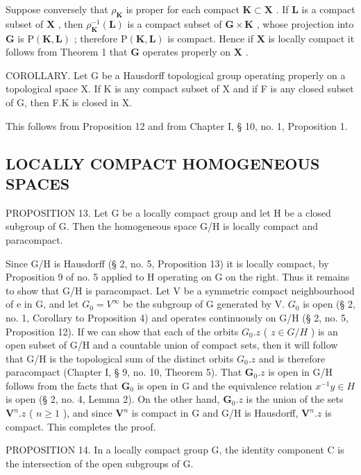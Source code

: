 Suppose conversely that \(\rho_{\mathbf{K}}\) is proper for each compact \(\mathbf{K} \subset \mathbf{X}\) . If \(\mathbf{L}\) is a compact subset of \(\mathbf{X}\) , then \(\rho_{\mathbf{K}}^{-1}(\mathbf{L})\) is a compact subset of \(\mathbf{G} \times \mathbf{K}\) , whose projection into \(\mathbf{G}\) is \(\mathrm{P}(\mathbf{K}, \mathbf{L})\) ; therefore \(\mathrm{P}(\mathbf{K}, \mathbf{L})\) is compact. Hence if \(\mathbf{X}\) is locally compact it follows from Theorem 1 that \(\mathbf{G}\) operates properly on \(\mathbf{X}\) .

COROLLARY. Let G be a Hausdorff topological group operating properly on a topological space X. If K is any compact subset of X and if F is any closed subset of G, then F.K is closed in X.

This follows from Proposition 12 and from Chapter I, § 10, no. 1, Proposition 1.

\subsection{LOCALLY COMPACT HOMOGENEOUS SPACES}

PROPOSITION 13. Let G be a locally compact group and let H be a closed subgroup of G. Then the homogeneous space G/H is locally compact and paracompact.

Since G/H is Hausdorff (§ 2, no. 5, Proposition 13) it is locally compact, by Proposition 9 of no. 5 applied to H operating on G on the right. Thus it remains to show that G/H is paracompact. Let V be a symmetric compact neighbourhood of e in G, and let \(G_{0}=V^{\infty}\) be the subgroup of G generated by V. \(G_{0}\) is open (§ 2, no. 1, Corollary to Proposition 4) and operates continuously on G/H (§ 2, no. 5, Proposition 12). If we can show that each of the orbits \(G_{0}.z\) ( \(z\in G/H\) ) is an open subset of G/H and a countable union of compact sets, then it will follow that G/H is the topological sum of the distinct orbits \(G_{0}.z\) and is therefore paracompact (Chapter I, § 9, no. 10, Theorem 5). That \(\mathbf{G}_0.z\) is open in G/H follows from the facts that \(\mathbf{G}_0\) is open in G and the equivalence relation \(x^{-1}y\in H\) is open (§ 2, no. 4, Lemma 2). On the other hand, \(\mathbf{G}_0.z\) is the union of the sets \(\mathbf{V}^n.z\) ( \(n\geqslant 1\) ), and since \(\mathbf{V}^n\) is compact in G and G/H is Hausdorff, \(\mathbf{V}^n.z\) is compact. This completes the proof.

PROPOSITION 14. In a locally compact group G, the identity component C is the intersection of the open subgroups of G.

